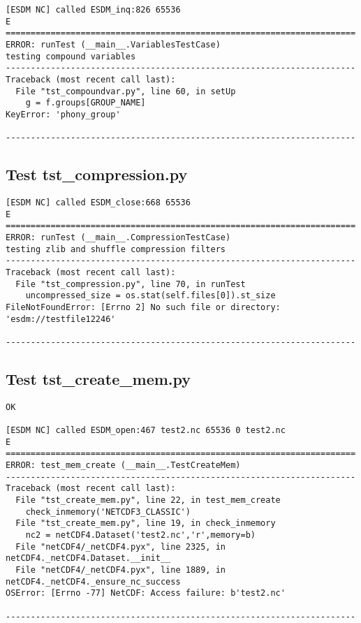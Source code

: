 \begin{verbatim}
[ESDM NC] called ESDM_inq:826 65536
E
======================================================================
ERROR: runTest (__main__.VariablesTestCase)
testing compound variables
----------------------------------------------------------------------
Traceback (most recent call last):
  File "tst_compoundvar.py", line 60, in setUp
    g = f.groups[GROUP_NAME]
KeyError: 'phony_group'

----------------------------------------------------------------------
\end{verbatim}

\subsection{Test tst\_compression.py}

\begin{verbatim}
[ESDM NC] called ESDM_close:668 65536
E
======================================================================
ERROR: runTest (__main__.CompressionTestCase)
testing zlib and shuffle compression filters
----------------------------------------------------------------------
Traceback (most recent call last):
  File "tst_compression.py", line 70, in runTest
    uncompressed_size = os.stat(self.files[0]).st_size
FileNotFoundError: [Errno 2] No such file or directory: 'esdm://testfile12246'

----------------------------------------------------------------------
\end{verbatim}

\subsection{Test tst\_create\_mem.py}

\begin{verbatim}
OK

[ESDM NC] called ESDM_open:467 test2.nc 65536 0 test2.nc
E
======================================================================
ERROR: test_mem_create (__main__.TestCreateMem)
----------------------------------------------------------------------
Traceback (most recent call last):
  File "tst_create_mem.py", line 22, in test_mem_create
    check_inmemory('NETCDF3_CLASSIC')
  File "tst_create_mem.py", line 19, in check_inmemory
    nc2 = netCDF4.Dataset('test2.nc','r',memory=b)
  File "netCDF4/_netCDF4.pyx", line 2325, in netCDF4._netCDF4.Dataset.__init__
  File "netCDF4/_netCDF4.pyx", line 1889, in netCDF4._netCDF4._ensure_nc_success
OSError: [Errno -77] NetCDF: Access failure: b'test2.nc'

----------------------------------------------------------------------
\end{verbatim}


